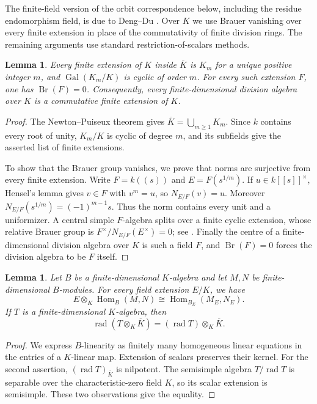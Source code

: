 \documentclass[11pt, reqno]{amsart}
\numberwithin{equation}{section}
\newtheorem{lemma}[theorem]{Lemma}
\theoremstyle{definition}
\theoremstyle{remark}
\newcommand{\op}[1]{\operatorname{#1}}
\newcommand{\Hom}{\op{Hom}}
\newcommand{\rad}{\op{rad}}
\newcommand{\Gal}{\op{Gal}}
\newcommand{\Br}{\op{Br}}
\newcommand{\Kbar}{\overline K}
\newcommand{\iso}{\cong}
\begin{document}
The finite-field version of the orbit correspondence below, including
the residue endomorphism field, is due to Deng--Du
\cite[Theorem~5.1 and Corollary~5.2]{DengDu}. Over $K$ we use Brauer
vanishing over every finite extension in place of the commutativity
of finite division rings. The remaining arguments use standard restriction-of-scalars methods.

\begin{lemma}\label{lem:fields}
Every finite extension of $K$ inside $\Kbar$ is $K_m$ for a unique
positive integer $m$, and $\Gal(K_m/K)$ is cyclic of order $m$.
For every such extension $F$, one has $\Br(F)=0$. Consequently,
every finite-dimensional division algebra over $K$ is a commutative
finite extension of $K$.
\end{lemma}
\begin{proof}
The Newton--Puiseux theorem gives $\Kbar=\bigcup_{m\ge1}K_m$.
Since $k$ contains every root of unity, $K_m/K$ is cyclic of degree
$m$, and its subfields give the asserted list of finite extensions.

To show that the Brauer group vanishes, we prove that norms are
surjective from every finite extension. Write $F=k((s))$ and $E=F(s^{1/m})$. If
$u\in k[[s]]^\times$, Hensel's lemma gives $v\in F$ with $v^m=u$,
so $N_{E/F}(v)=u$. Moreover
$N_{E/F}(s^{1/m})=(-1)^{m-1}s$. Thus the norm contains every unit
and a uniformizer. A central simple $F$-algebra splits over a finite
cyclic extension, whose relative Brauer group is
$F^\times/N_{E/F}(E^\times)=0$; see \cite[Chapters~4 and~6]{GS}.
Finally the centre of a finite-dimensional division algebra over $K$
is such a field $F$, and $\Br(F)=0$ forces the division algebra to
be $F$ itself.
\end{proof}

\begin{lemma}\label{lem:basechange}
Let $B$ be a finite-dimensional $K$-algebra and let $M,N$ be
finite-dimensional $B$-modules. For every field extension $E/K$, we have
\[ E\otimes_K\Hom_B(M,N)\iso\Hom_{B_E}(M_E,N_E). \]
If $T$ is a finite-dimensional $K$-algebra, then
\[ \rad(T\otimes_K\Kbar)=(\rad T)\otimes_K\Kbar. \]
\end{lemma}
\begin{proof}
We express $B$-linearity as finitely many homogeneous linear equations
in the entries of a $K$-linear map. Extension of scalars preserves
their kernel. For the second assertion,
$(\rad T)_{\Kbar}$ is nilpotent. The semisimple algebra $T/\rad T$
is separable over the characteristic-zero field $K$, so its scalar
extension is semisimple. These two observations give the equality.
\end{proof}
\end{document}
